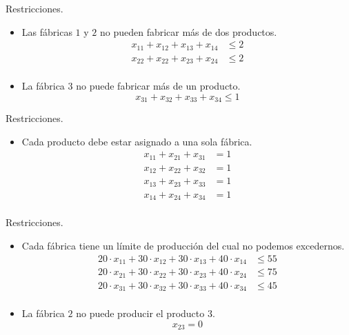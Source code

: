\documentclass{beamer}
\begin{document}
\begin{frame}[fragile]{Restricciones.}
  \begin{itemize}
    \item Las fábricas $1$ y $2$ no pueden fabricar más de dos productos.
      \pause 
      \begin{align*}
        x_{11} + x_{12} + x_{13} + x_{14} & \le 2 \\
        x_{22} + x_{22} + x_{23} + x_{24} & \le 2 \\
      \end{align*}
      \pause 
      \item La fábrica $3$ no puede fabricar más de un producto.
      \[
        x_{31} + x_{32} + x_{33} + x_{34}  \le 1
      \]
  \end{itemize}
\end{frame}

\begin{frame}[fragile]{Restricciones.}
  \begin{itemize}
    \item Cada producto debe estar asignado a una sola fábrica.
    \pause 
      \begin{align*}
        x_{11} + x_{21} + x_{31} &= 1 \\
        x_{12} + x_{22} + x_{32} &= 1 \\
        x_{13} + x_{23} + x_{33} &= 1 \\
        x_{14} + x_{24} + x_{34} &= 1 \\
      \end{align*}
  \end{itemize}
\end{frame}

\begin{frame}[fragile]{Restricciones.}
  \begin{itemize}
    \item Cada fábrica tiene un límite de producción del cual no podemos excedernos.
    \pause 
      \begin{align*}
        20 \cdot x_{11}  + 30 \cdot x_{12}  + 30 \cdot x_{13}  + 40 \cdot x_{14}  & \le 55 \\
        20 \cdot x_{21}  + 30 \cdot x_{22}  + 30 \cdot x_{23}  + 40 \cdot x_{24}  & \le 75 \\
        20 \cdot x_{31}  + 30 \cdot x_{32}  + 30 \cdot x_{33}  + 40 \cdot x_{34}  & \le 45 \\
      \end{align*}
    \pause   
    \item La fábrica $2$ no puede producir el producto $3$.  
    \pause
      \[
        x_{23} = 0
      \]
  \end{itemize}
\end{frame}
\end{document}
